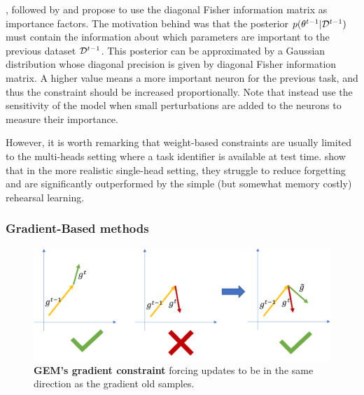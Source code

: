 \cite{kirkpatrick2017ewc}, followed by \cite{zenke2017synaptic_intelligence} and
\cite{chaudhry2018riemannien_walk} propose to use the diagonal Fisher information matrix as
importance factors. The motivation behind was that the posterior $p(\theta^{t-1} | \mathcal{D}^{t-1})$ must
contain the information about which parameters are important to the previous dataset $\mathcal{D}^{t-1}$.
This posterior can be approximated by a Gaussian distribution whose diagonal precision is given by
diagonal Fisher information matrix. A higher value means a more important neuron for the previous
task, and thus the constraint should be increased proportionally. Note that
\cite{aljundi2018MemoryAwareSynapses} instead use the sensitivity of the model when small
perturbations are added to the neurons to measure their importance.

However, it is worth remarking that weight-based constraints are usually limited to the multi-heads
setting where a task identifier is available at test time. \cite{lesort2019regulshortcomings} show
that in the more realistic single-head setting, they struggle to reduce forgetting and are significantly
outperformed by the simple (but somewhat memory costly) rehearsal learning.

\subsubsection{Gradient-Based methods}
\label{sec:related_regul_gradient}

\begin{figure}[tb]
      \begin{center}
            \includegraphics[width=1.0\linewidth]{images/related/gem.pdf}
      \end{center}
      \caption{\textbf{GEM's gradient constraint} forcing updates to be in the same direction as the
            gradient \wrt old samples.}
      \label{fig:related_gem}
\end{figure}

